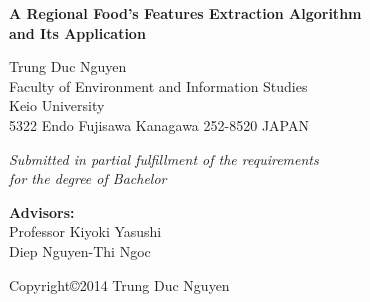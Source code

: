 \documentclass[12pt,a4j]{report}
\begin{document}
\thispagestyle{empty}
\parindent=1pt

\begin{center}

\vspace{30mm}

{\Large\bf A Regional Food's Features Extraction Algorithm}\\ 
{\Large\bf and Its Application}\\
\vspace{3mm}

\vspace{10mm}

{\LARGE Trung Duc Nguyen }\\
\vspace{10mm}
{\Large Faculty of Environment and Information Studies}\\
\vspace{5mm}
{\LARGE Keio University}\\
\vspace{5mm}
{\Large 5322 Endo Fujisawa Kanagawa 252-8520}
{\Large JAPAN}\\
\vspace{10mm}

{\Large\it  Submitted in partial fulfillment of the requirements} \\
\vspace{3mm}
{\Large\it  for the degree of Bachelor}\\

\vspace{12mm}

\textbf{{\Large Advisors:}}\\
\vspace{5mm}
{\Large Professor Kiyoki Yasushi}\\
\vspace{2mm}
{\Large Diep Nguyen-Thi Ngoc}\\
\vspace{2mm}


\vspace{12mm}

{\large Copyright\copyright  2014 Trung Duc Nguyen}

\end{center}
\end{document}
